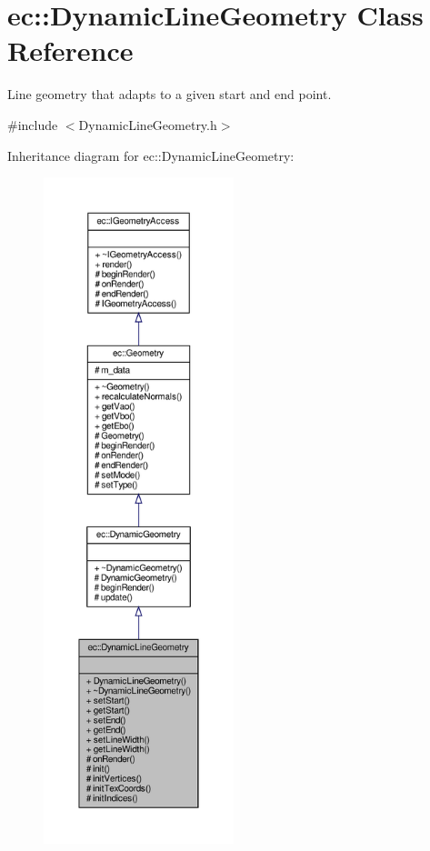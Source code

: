 \hypertarget{classec_1_1_dynamic_line_geometry}{}\section{ec\+:\+:Dynamic\+Line\+Geometry Class Reference}
\label{classec_1_1_dynamic_line_geometry}


Line geometry that adapts to a given start and end point.  




{\ttfamily \#include $<$Dynamic\+Line\+Geometry.\+h$>$}



Inheritance diagram for ec\+:\+:Dynamic\+Line\+Geometry\+:\nopagebreak
\begin{figure}[H]
\begin{center}
\leavevmode
\includegraphics[height=550pt]{classec_1_1_dynamic_line_geometry__inherit__graph}
\end{center}
\end{figure}


